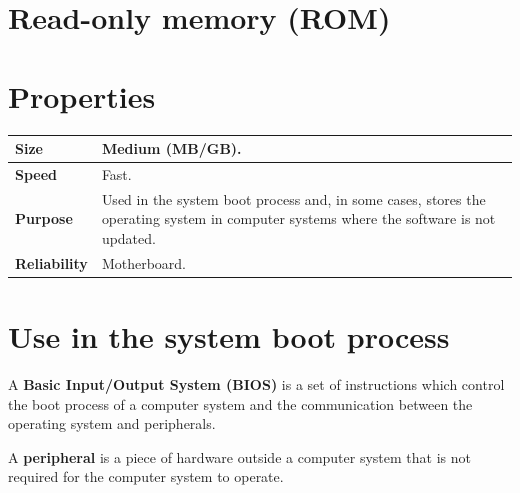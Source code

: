 \documentclass[a4paper]{systems-software}
\begin{document}
\section{Read-only memory (ROM)}

\section*{Properties}

\begin{longtabu} to \textwidth {| X[1,l] | X[6,l] |}
    \hline
    \textbf{Size} & Medium (MB/GB).
	\\ \hline
	\textbf{Speed} & Fast.
	\\ \hline
	\textbf{Purpose} & Used in the system boot process and, in some cases, stores the operating system in computer systems where the software is not updated.
	\\ \hline
	\textbf{Reliability} & Motherboard.
	\\ \hline
\end{longtabu}


\section*{Use in the system boot process}

A \textbf{Basic Input/Output System (BIOS)} is a set of instructions which control the boot process of a computer system and the communication between the operating system and peripherals.

A \textbf{peripheral} is a piece of hardware outside a computer system that is not required for the computer system to operate.
\end{document}
